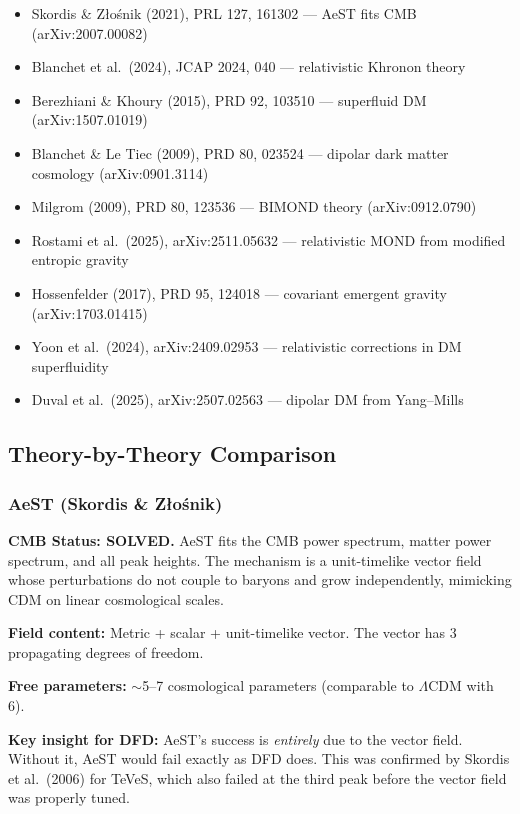\documentclass[11pt,a4paper]{article}
\begin{document}
\begin{itemize}
\item Skordis \& Z{\l}o\'{s}nik (2021), PRL 127, 161302 --- AeST fits CMB (arXiv:2007.00082)
\item Blanchet et al.\ (2024), JCAP 2024, 040 --- relativistic Khronon theory
\item Berezhiani \& Khoury (2015), PRD 92, 103510 --- superfluid DM (arXiv:1507.01019)
\item Blanchet \& Le Tiec (2009), PRD 80, 023524 --- dipolar dark matter cosmology (arXiv:0901.3114)
\item Milgrom (2009), PRD 80, 123536 --- BIMOND theory (arXiv:0912.0790)
\item Rostami et al.\ (2025), arXiv:2511.05632 --- relativistic MOND from modified entropic gravity
\item Hossenfelder (2017), PRD 95, 124018 --- covariant emergent gravity (arXiv:1703.01415)
\item Yoon et al.\ (2024), arXiv:2409.02953 --- relativistic corrections in DM superfluidity
\item Duval et al.\ (2025), arXiv:2507.02563 --- dipolar DM from Yang--Mills
\end{itemize}

\subsection{Theory-by-Theory Comparison}

\subsubsection{AeST (Skordis \& Z{\l}o\'{s}nik)}

\textbf{CMB Status: SOLVED.} AeST fits the CMB power spectrum, matter power spectrum, and all peak heights. The mechanism is a unit-timelike vector field whose perturbations do not couple to baryons and grow independently, mimicking CDM on linear cosmological scales.

\textbf{Field content:} Metric + scalar + unit-timelike vector. The vector has 3 propagating degrees of freedom.

\textbf{Free parameters:} $\sim$5--7 cosmological parameters (comparable to $\Lambda$CDM with 6).

\textbf{Key insight for DFD:} AeST's success is \emph{entirely} due to the vector field. Without it, AeST would fail exactly as DFD does. This was confirmed by Skordis et al.\ (2006) for TeVeS, which also failed at the third peak before the vector field was properly tuned.
\end{document}
